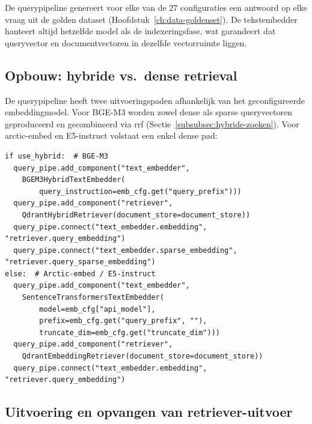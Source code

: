 De querypipeline genereert voor elke van de 27 configuraties een antwoord op elke vraag uit de golden dataset (Hoofdstuk~\ref{ch:data-goldenset}). De tekstembedder hanteert altijd hetzelfde model als de indexeringsfase, wat garandeert dat queryvector en documentvectoren in dezelfde vectorruimte liggen.

\subsection{Opbouw: hybride vs.\ dense retrieval}

De querypipeline heeft twee uitvoeringspaden afhankelijk van het geconfigureerde embeddingmodel. Voor BGE-M3 worden zowel dense als sparse queryvectoren geproduceerd en gecombineerd via \gls{rrf} (Sectie~\ref{subsubsec:hybride-zoeken}). Voor arctic-embed en E5-instruct volstaat een enkel dense pad:

\begin{listing}[H]
\begin{verbatim}
if use_hybrid:  # BGE-M3
  query_pipe.add_component("text_embedder",
    BGEM3HybridTextEmbedder(
        query_instruction=emb_cfg.get("query_prefix")))
  query_pipe.add_component("retriever",
    QdrantHybridRetriever(document_store=document_store))
  query_pipe.connect("text_embedder.embedding", "retriever.query_embedding")
  query_pipe.connect("text_embedder.sparse_embedding", "retriever.query_sparse_embedding")
else:  # Arctic-embed / E5-instruct
  query_pipe.add_component("text_embedder",
    SentenceTransformersTextEmbedder(
        model=emb_cfg["api_model"],
        prefix=emb_cfg.get("query_prefix", ""),
        truncate_dim=emb_cfg.get("truncate_dim")))
  query_pipe.add_component("retriever",
    QdrantEmbeddingRetriever(document_store=document_store))
  query_pipe.connect("text_embedder.embedding", "retriever.query_embedding")
\end{verbatim}
\caption[Querypipeline: hybride pad voor BGE-M3, dense pad voor de overige modellen]{De \texttt{QdrantHybridRetriever} combineert dense en sparse resultaten via \gls{rrf} \autocite{QdrantHybrid2025}. De \texttt{truncate\_dim}-parameter voor arctic-embed activeert de \gls{mrl}-truncatie naar 256 dimensies (Sectie~\ref{subsubsec:matryoshka}).}
\label{lst:query-pipeline}
\end{listing}

\subsection{Uitvoering en opvangen van retriever-uitvoer}

